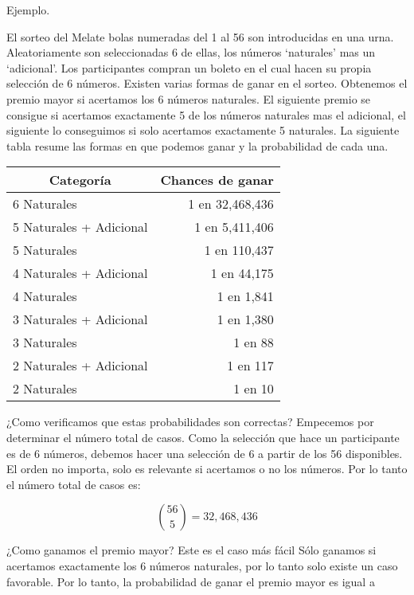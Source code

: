 \documentclass[14pt]{extreport}
\begin{document}
\par\noindent
Ejemplo.

El sorteo del Melate bolas numeradas del 1 al 56 son introducidas en una urna. Aleatoriamente son seleccionadas 6 de ellas, los números `naturales' mas un `adicional'. Los participantes compran un boleto en el cual hacen su propia selección de 6 números. Existen varias formas de ganar en el sorteo. Obtenemos el premio mayor si acertamos los 6 números naturales. El siguiente premio se consigue si acertamos exactamente 5 de los números naturales mas el adicional, el siguiente lo conseguimos si solo acertamos exactamente 5 naturales. La siguiente tabla resume las formas en que podemos ganar y la probabilidad de cada una.


\begin{center}
  \begin{tabular}{@{}lr@{}}
    \toprule
    \multicolumn{1}{c}{Categoría} & \multicolumn{1}{c}{Chances de ganar}\\ 
    \midrule
    6 Naturales             & 1 en 32,468,436 \\\midrule
    5 Naturales + Adicional & 1 en 5,411,406  \\\midrule
    5 Naturales             & 1 en 110,437    \\\midrule
    4 Naturales + Adicional & 1 en 44,175     \\\midrule
    4 Naturales             & 1 en 1,841      \\\midrule
    3 Naturales + Adicional & 1 en 1,380      \\\midrule
    3 Naturales             & 1 en 88         \\\midrule
    2 Naturales + Adicional & 1 en 117        \\\midrule
    2 Naturales             & 1 en 10         \\\bottomrule
  \end{tabular}
\end{center}

¿Como verificamos que estas probabilidades son correctas? Empecemos por determinar el número total de casos. Como la selección que hace un participante es de 6 números, debemos hacer una selección de 6 a partir de los 56 disponibles. El orden no importa, solo es relevante si acertamos o no los números. Por lo tanto el número total de casos es: 

$$
\binom{56}{5}= 32,468,436
$$

¿Como ganamos el premio mayor? Este es el caso más fácil Sólo ganamos si acertamos exactamente los 6 números naturales, por lo tanto solo existe un caso favorable. Por lo tanto, la probabilidad de ganar el premio mayor es igual a 
\end{document}
